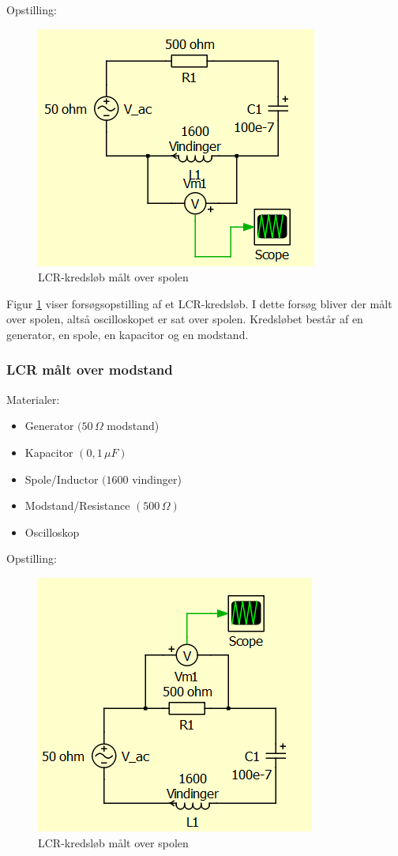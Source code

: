 Opstilling:

\begin{figure}[H]
\centering
\includegraphics[scale=1]{Vildledning/Schematics/Kredslb/LCR_spole}
\caption{LCR-kredsløb målt over spolen}
\label{lcrspole}
\end{figure}

Figur \ref{lcrspole} viser forsøgsopstilling af et LCR-kredsløb. I dette forsøg bliver der målt over spolen, altså oscilloskopet er sat over spolen. Kredsløbet består af en generator, en spole, en kapacitor og en modstand.

\subsubsection{LCR målt over modstand}

Materialer:

\begin{itemize}
\item Generator $(50\, \Omega$ modstand)
\item Kapacitor $( 0,1\, \mu F)$
\item Spole/Inductor $(1600$ vindinger)
\item Modstand/Resistance $(500\, \Omega)$
\item Oscilloskop
\end{itemize}

Opstilling:

\begin{figure}[H]
\centering
\includegraphics[scale=1]{Vildledning/Schematics/Kredslb/LCR_modstand}
\caption{LCR-kredsløb målt over spolen}
\label{lcrmodstand}
\end{figure}

